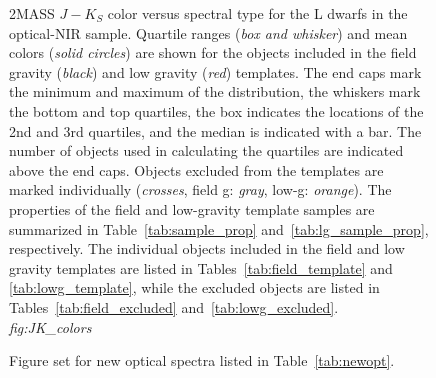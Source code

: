 \documentclass[12pt,preprint]{aastex}
\begin{document}
\begin{figure}
		\caption{2MASS $J-K_S$ color versus spectral type for the L dwarfs in the optical-NIR sample. 
		Quartile ranges (\emph{box and whisker}) and mean colors (\emph{solid circles}) are shown for the objects included in the field gravity (\emph{black}) and low gravity (\emph{red}) templates. The end caps mark the minimum and maximum of the distribution, the whiskers mark the bottom and top quartiles, the box indicates the locations of the 2nd and 3rd quartiles, and the median is indicated with a bar. The number of objects used in calculating the quartiles are indicated above the end caps.
		Objects excluded from the templates are marked individually (\emph{crosses}, field g: \emph{gray}, low-g: \emph{orange}).
		The properties of the field and low-gravity template samples are summarized in Table~\ref{tab:sample_prop} and~\ref{tab:lg_sample_prop}, respectively. The individual objects included in the field and low gravity templates are listed in Tables~\ref{tab:field_template} and \ref{tab:lowg_template}, while the excluded objects are listed in Tables~\ref{tab:field_excluded} and~\ref{tab:lowg_excluded}.\\
		\emph{fig:JK\_colors} }
	\label{fig:JK_colors}
\end{figure}

\begin{figure}
		\caption{Figure set for new optical spectra listed in Table~\ref{tab:newopt}.}
	\label{fig:newopt}
\end{figure}
\end{document}
